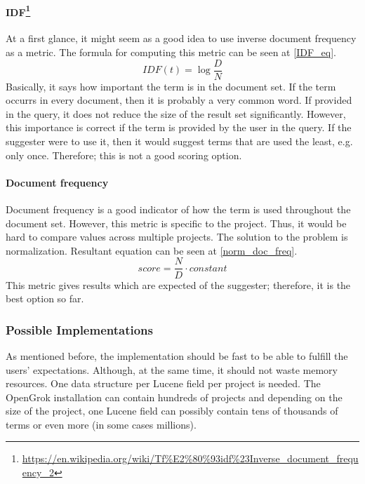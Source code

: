 \paragraph{IDF\protect\footnote{\url{https://en.wikipedia.org/wiki/Tf\%E2\%80\%93idf\%23Inverse\_document\_frequency\_2}}}
At a first glance, it might seem as a good idea to use inverse document frequency as a metric. The formula for computing this metric can be seen at \ref{IDF_eq}.
\begin{equation}
\label{IDF_eq}
IDF(t) = \log{\frac{D}{N}}
\end{equation}
Basically, it says how important the term is in the document set. If the term occurrs in every document, then it is probably
a very common word. If provided in the query, it does not reduce the size of the result set significantly.
However, this importance is correct if the term is
provided by the user in the query. If the suggester were to use it, then it would suggest terms that are used the least, e.g. only once.
Therefore; this is not a good scoring option.

\paragraph{Document frequency}
Document frequency is a good indicator of how the term is used throughout the document set. However,
this metric is specific to the project. Thus, it would be hard to compare values across multiple projects. The solution
to the problem is normalization. Resultant equation can be seen at \ref{norm_doc_freq}.
\begin{equation}
\label{norm_doc_freq}
score = \frac{N}{D} \cdot constant
\end{equation}
This metric gives results which are expected of the suggester; therefore, it is the best option so far.


\subsubsection{Possible Implementations}
\label{possible_implementations}
As mentioned before, the implementation should be fast to be able to fulfill the users' expectations. Although, at the
same time, it should not waste memory resources. One data structure per Lucene field per project is needed. The OpenGrok
installation can contain hundreds of projects and depending on the size of the project, one Lucene field can possibly contain
tens of thousands of terms or even more (in some cases millions).

